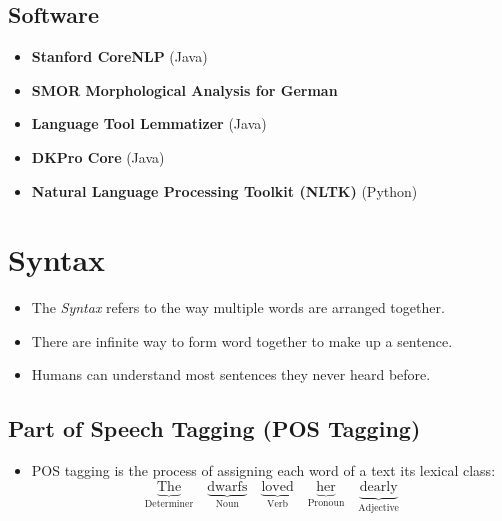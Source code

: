 \documentclass[a4paper, 11pt, accentcolor = tud3b]{tudreport}
\begin{document}
            \subsection{Software} %
                \begin{itemize}
                	\item \textbf{Stanford CoreNLP} (Java)
                	\item \textbf{SMOR Morphological Analysis for German}
                	\item \textbf{Language Tool Lemmatizer} (Java)
                	\item \textbf{DKPro Core} (Java)
                	\item \textbf{Natural Language Processing Toolkit (NLTK)} (Python)
                \end{itemize}

        \section{Syntax} %
            \begin{itemize}
            	\item The \textit{Syntax} refers to the way multiple words are arranged together.
            	\item There are infinite way to form word together to make up a sentence.
            	\item Humans can understand most sentences they never heard before.
            \end{itemize}

            \subsection{Part of Speech Tagging (POS Tagging)} %
                \begin{itemize}
                	\item POS tagging is the process of assigning each word of a text its lexical class:
                		\begin{equation*}
	                		\underbrace{\text{The}}_\text{Determiner} \quad \underbrace{\text{dwarfs}}_\text{Noun} \quad \underbrace{\text{loved}}_\text{Verb} \quad \underbrace{\text{her}}_\text{Pronoun} \quad \underbrace{\text{dearly}}_\text{Adjective}
                		\end{equation*}
                \end{itemize}
\end{document}
